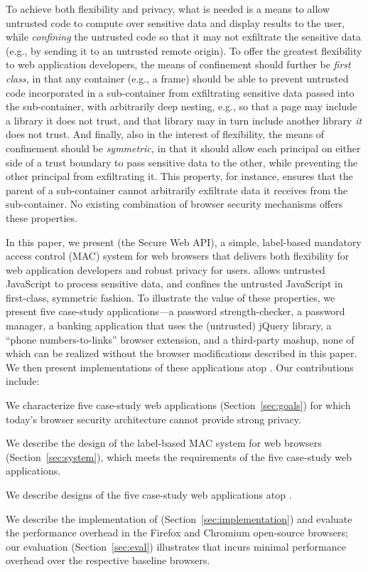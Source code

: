 To achieve both flexibility and privacy, what is needed is a means to
allow untrusted code to compute over sensitive data and display
results to the user, while \emph{confining} the untrusted code so that
it may not exfiltrate the sensitive data (e.g., by sending it to an untrusted remote
origin).
%
To offer the greatest flexibility to web application developers, the
means of confinement should further be \emph{first class,} in that any
container (e.g., a frame) should be able to prevent untrusted code
incorporated in a sub-container from exfiltrating sensitive data passed
into the sub-container, with arbitrarily deep nesting, e.g., so that a
page may include a library it does not trust, and that library may in
turn include another library \emph{it} does not trust.
%
And finally, also in the interest of flexibility, the means of
confinement should be \emph{symmetric,} in that it should allow each
principal on either side of a trust boundary to pass sensitive data to
the other, while preventing the other principal from exfiltrating it.  
%
This property, for instance, ensures that the parent of a
sub-container cannot arbitrarily exfiltrate data it receives from the
sub-container.
%
No existing combination of browser security mechanisms offers these
properties.

In this paper, we present \sys{} (the Secure Web API), a simple,
label-based mandatory access control (MAC) system for web browsers
that delivers both flexibility for web application developers and
robust privacy for users. \sys{} allows untrusted JavaScript to
process sensitive data, and confines the untrusted JavaScript in
first-class, symmetric fashion.  To illustrate the value of these
properties, we present five case-study applications---a password
strength-checker, a password manager, a banking application that uses
the (untrusted) jQuery library, a ``phone numbers-to-links'' browser
extension, and a third-party mashup, none of which can be realized
without the browser modifications described in this paper.  We then
present implementations of these applications atop \sys. Our
contributions include:

\begin{CompactItemize}
\item We characterize five case-study web applications
  (Section~\ref{sec:goals}) for which today's browser security
  architecture cannot provide strong privacy.
\item We describe the design of the \sys{} label-based MAC system
  for web browsers (Section~\ref{sec:system}), which meets the
  requirements of the five case-study web applications.
\item We describe designs of the five case-study web applications atop
  \sys.
\item We describe the implementation of \sys{}
  (Section~\ref{sec:implementation}) and evaluate the performance
  overhead in the Firefox and Chromium open-source browsers; our
  evaluation (Section~\ref{sec:eval}) illustrates that \sys{} incurs
  minimal performance overhead over the respective baseline browsers.
\end{CompactItemize}

